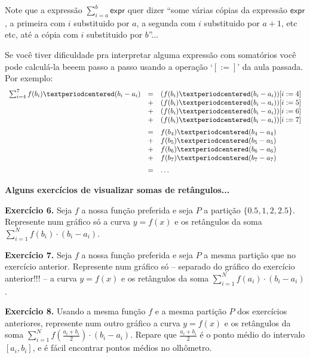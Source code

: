 \documentclass[oneside,12pt]{article}
\begin{document}
\newpage


Note que a expressão $\sum_{i=a}^b \mathsf{expr}$ quer dizer ``some
várias cópias da expressão $\mathsf{expr}$, a primeira com $i$
substituido por $a$, a segunda com $i$ substituido por $a+1$, etc etc,
até a cópia com $i$ substituido por $b$''...

Se você tiver dificuldade pra interpretar alguma expressão com
somatórios você pode calculá-la beeem passo a passo usando a operação
`$[:=]$' da aula passada. Por exemplo:
%
$$\scalebox{0.90}{$
  \begin{array}{rcl}
  \sum_{i=4}^7 f(b_i)·(b_i-a_i)
     &=& (f(b_i)·(b_i-a_i))[i:=4] \\
     &+& (f(b_i)·(b_i-a_i))[i:=5] \\
     &+& (f(b_i)·(b_i-a_i))[i:=6] \\
     &+& (f(b_i)·(b_i-a_i))[i:=7] \\[5pt]
     &=&  f(b_4)·(b_4-a_4) \\
     &+&  f(b_5)·(b_5-a_5) \\
     &+&  f(b_6)·(b_6-a_6) \\
     &+&  f(b_7)·(b_7-a_7) \\[5pt]
     &=& \ldots \\
  \end{array}
  $}
$$



\newpage


{\bf Alguns exercícios de visualizar somas de retângulos...}

\ssk

{\bf Exercício 6.} Seja $f$ a nossa função preferida e seja $P$ a
partição $\{0.5,1,2,2.5\}$. Represente num gráfico só a curva $y=f(x)$
e os retângulos da soma $\sum_{i=1}^N f(b_i)·(b_i-a_i)$.

\msk

{\bf Exercício 7.} Seja $f$ a nossa função preferida e seja $P$ a
mesma partição que no exercício anterior. Represente num gráfico só --
separado do gráfico do exercício anterior!!! -- a curva $y=f(x)$ e os
retângulos da soma $\sum_{i=1}^N f(a_i)·(b_i-a_i)$.

\msk

{\bf Exercício 8.} Usando a mesma função $f$ e a mesma partição $P$
dos exercícios anteriores, represente num outro gráfico a curva
$y=f(x)$ e os retângulos da soma $\sum_{i=1}^N
f(\frac{a_i+b_i}{2})·(b_i-a_i)$. Repare que $\frac{a_i+b_i}{2}$ é o
ponto médio do intervalo $[a_i,b_i]$, e é fácil encontrar pontos
médios no olhômetro.
\end{document}
